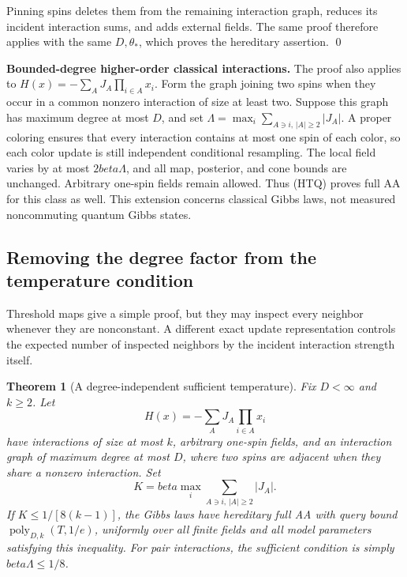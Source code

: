 \documentclass[11pt]{article}
\newtheorem{theorem}{Theorem}[section]
\theoremstyle{definition}
\theoremstyle{remark}
\def\beta{beta}\def\gamma{gamma}\def\lambda{lambda}%
\begin{document}
Pinning spins deletes them from the remaining interaction graph,
reduces its incident interaction sums, and adds external fields.
The same proof therefore applies with the same \(D,\theta_*\),
which proves the hereditary assertion. \qed

\textbf{Bounded-degree higher-order classical interactions.}
The proof also applies to
\(H(x)=-\sum_A J_A\prod_{i\in A}x_i\). Form the graph joining two
spins when they occur in a common nonzero interaction of size at least
two. Suppose this graph has maximum degree at most \(D\), and set
\(\Lambda=\max_i\sum_{A\ni i,\,|A|\ge2}|J_A|\).
A proper coloring ensures that every interaction contains at most one
spin of each color, so each color update is still independent
conditional resampling. The local field varies by at most
\(2\beta\Lambda\), and all map, posterior, and cone bounds are
unchanged. Arbitrary one-spin fields remain allowed. Thus (HTQ)
proves full AA for this class as well. This extension concerns
classical Gibbs laws, not measured noncommuting quantum Gibbs states.

\subsection{Removing the degree factor from the temperature condition}
\label{resolution-dynamics:weighted-maps}

Threshold maps give a simple proof, but they may inspect every neighbor
whenever they are nonconstant. A different exact update representation
controls the expected number of inspected neighbors by the incident
interaction strength itself.

\begin{theorem}[A degree-independent sufficient temperature]
\label{thm:resolution-dynamics-weighted}
Fix \(D<\infty\) and \(k\ge2\). Let
\[
 H(x)=-\sum_A J_A\prod_{i\in A}x_i
\]
have interactions of size at most \(k\), arbitrary one-spin fields,
and an interaction graph of maximum degree at most \(D\), where two
spins are adjacent when they share a nonzero interaction. Set
\[
 K=\beta\max_i\sum_{A\ni i,\,|A|\ge2}|J_A|.
\]
If \(K\le1/[8(k-1)]\), the Gibbs laws have hereditary full AA with
query bound \(\operatorname{poly}_{D,k}(T,1/e)\), uniformly over all
finite fields and all model parameters satisfying this inequality.
For pair interactions, the sufficient condition is simply
\(\beta\Lambda\le1/8\).
\end{theorem}
\end{document}

